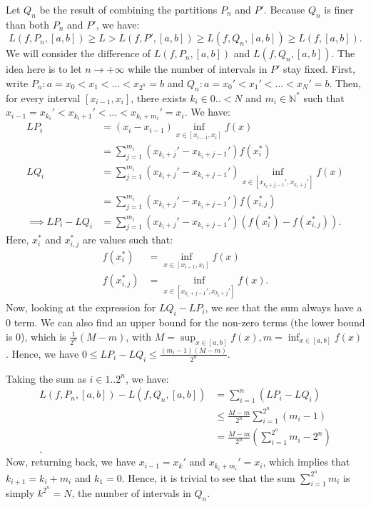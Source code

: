 \begin{enumerate}[label=\textbf{1A.\arabic*}]
  Let \( Q_{n} \) be the result of combining the partitions \( P_{n} \) and \(
  P' \). Because \( Q_{n} \) is finer than both \( P_{n} \) and \( P' \), we
  have:
  \[
    L(f, P_{n}, [a, b]) \ge L > L(f, P', [a, b]) \ge  L(f, Q_{n}, [a, b]) \ge  L(f,
    [a, b])
  .\] 
  We will consider the difference of \( L(f, P_{n}, [a, b]) \) and \(
  L(f, Q_{n}, [a, b]) \). The idea here is to let \( n \to +\infty \) while the
  number of intervals in \( P' \) stay fixed. First, write \( P_{n}: a = x_{0} <
  x_{1} < \ldots < x_{2^{n}} = b\) and \( Q_{n}: a = x_{0}' < x_{1}' < \ldots <
  x_{N}' = b\). Then, for every interval \( [x_{i-1}, x_{i}] \), there exists
  \( k_{i} \in 0..<N \) and \( m_{i} \in \mathbb{N}^{*} \) such that \( x_{i-1} =
  x_{k_{i}}' < x_{k_{i}+1}' < \ldots  < x_{k_{i} + m_{i}}' = x_{i} \). We have:
  \begin{align*}
    LP_{i} &= (x_{i} - x_{i-1}) \inf_{x \in [x_{i-1}, x_{i}]} f(x) \\
           &= \sum_{j = 1}^{m_{i}} (x_{k_{i}+j}'-x_{k_{i}+j-1}') f(x^{*}_{i}) \\
    LQ_{i} &= \sum_{j = 1}^{m_{i}} (x_{k_{i}+j}'-x_{k_{i}+j-1}') \inf_{x \in[x_{k_{i}
  + j - 1}', x_{k_{i}+j}']} f(x) \\
    &= \sum_{j = 1}^{m_{i}} (x_{k_{i}+j}'-x_{k_{i}+j-1}') f(x_{i,j}^{*}) \\
        \implies LP_{i} - LQ_{i} &= \sum_{j = 1}^{m_{i}}
        (x_{k_{i}+j}'-x_{k_{i}+j-1}')
        \left( f(x_{i}^{*}) - f(x_{i,j}^{*}) \right) 
  .\end{align*}
  Here, \( x^{*}_{i} \) and \( x_{i, j}^{*} \) are values such that:
  \begin{align*}
    f(x^{*}_{i}) &= \inf_{x \in [x_{i-1}, x_{i}]} f(x)\\
    f(x^{*}_{i,j}) &= \inf_{x \in [x_{k_{i}+j-1}', x_{k_{i}+j}']} f(x)
  .\end{align*}
  Now, looking at the expression for \( LQ_{i} - LP_{i} \), we see that the sum
  always have a \( 0 \) term. We can also find an upper bound for the non-zero
  terms (the lower bound is \( 0 \)), which is \( \frac{1}{2^{n}}(M - m) \),
  with \( M = \sup_{x \in [a, b]} f(x), m = \inf_{x \in [a, b]} f(x) \). Hence,
  we have \( 0 \le LP_{i} - LQ_{i} \le \frac{(m_{i} - 1)(M - m)}{2^{n}} \).

  Taking the sum as \( i \in 1..2^{n} \), we have:
  \begin{align*}
    L(f, P_{n}, [a, b]) - L(f, Q_{n}, [a, b]) &= \sum_{i = 1}^{n} (LP_{i} -
    LQ_{i}) \\
    &\le \frac{M - m}{2^{n}}\sum_{i = 1}^{2^{n}} (m_{i} - 1) \\
    &= \frac{M - m}{2^{n}} \left( \sum_{i = 1}^{2^{n}} m_{i} - 2^{n} \right)  \\
  .\end{align*}
  Now, returning back, we have \( x_{i - 1} = x_{k}' \) and \( x_{k_{i} +
  m_{i}}' = x_{i}\), which implies that \( k_{i + 1} = k_{i} + m_{i} \) and \(
  k_{1} = 0 \). Hence, it is trivial to see that the sum \( \sum_{i = 1}^{2^{n}}
  m_{i} \) is simply \( k^{2^{n}} = N \), the number of intervals in \( Q_{n}
  \).


\end{enumerate}
